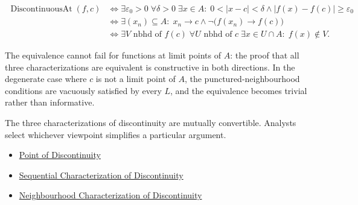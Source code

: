 \begin{remark*}
\[
\begin{aligned}
\operatorname{DiscontinuousAt}(f,c)
&\Longleftrightarrow
\exists \varepsilon_0>0\;\forall \delta>0\;\exists x\in A:\;0<|x-c|<\delta \land |f(x)-f(c)|\ge \varepsilon_0\\
&\Longleftrightarrow
\exists (x_n)\subseteq A:\; x_n \to c \land \neg\bigl(f(x_n)\to f(c)\bigr)\\
&\Longleftrightarrow
\exists V \text{ nbhd of } f(c)\;\forall U \text{ nbhd of } c\;\exists x\in U\cap A:\;f(x)\notin V.
\end{aligned}
\]
\end{remark*}

\begin{remark*}
The equivalence cannot fail for functions at limit points of $A$: the proof that all three characterizations are equivalent is constructive in both directions. In the degenerate case where $c$ is not a limit point of $A$, the punctured-neighbourhood conditions are vacuously satisfied by every $L$, and the equivalence becomes trivial rather than informative.
\end{remark*}

\begin{remark*}[Interpretation]
The three characterizations of discontinuity are mutually convertible. Analysts select whichever viewpoint simplifies a particular argument.
\end{remark*}

\begin{remark*}[Dependencies]
\begin{itemize}
  \item \hyperref[def:point-of-discontinuity]{Point of Discontinuity}
  \item \hyperref[def:sequential-discontinuity-at-a-point]{Sequential Characterization of Discontinuity}
  \item \hyperref[def:neighborhood-discontinuity-at-a-point]{Neighbourhood Characterization of Discontinuity}
\end{itemize}
\end{remark*}


